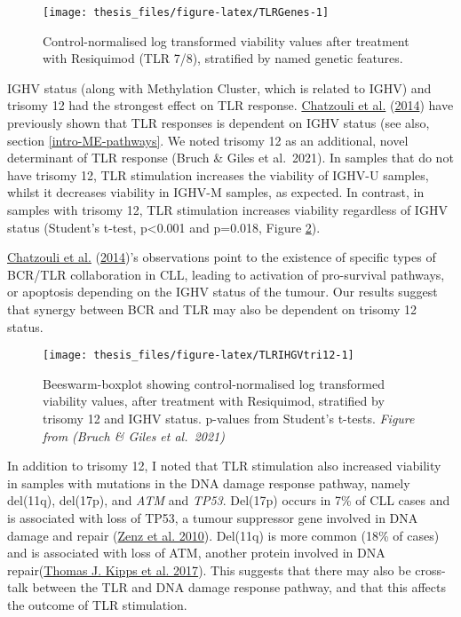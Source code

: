 \documentclass[11pt, a4paper, twosided]{book}
\begin{document}
\begin{figure}

{\centering \texttt{[image: thesis\_files/figure-latex/TLRGenes-1]} 

}

\caption{Control-normalised log transformed viability values after treatment with Resiquimod (TLR 7/8), stratified by named genetic features.}\label{fig:TLRGenes}
\end{figure}
IGHV status (along with Methylation Cluster, which is related to IGHV) and trisomy 12 had the strongest effect on TLR response. \protect\hyperlink{ref-Chatzouli2014}{Chatzouli et al.} (\protect\hyperlink{ref-Chatzouli2014}{2014}) have previously shown that TLR responses is dependent on IGHV status (see also, section \ref{intro-ME-pathways}. We noted trisomy 12 as an additional, novel determinant of TLR response (Bruch \& Giles et al.~2021). In samples that do not have trisomy 12, TLR stimulation increases the viability of IGHV-U samples, whilst it decreases viability in IGHV-M samples, as expected. In contrast, in samples with trisomy 12, TLR stimulation increases viability regardless of IGHV status (Student's t-test, p\textless0.001 and p=0.018, Figure \ref{fig:TLRIHGVtri12}).

\protect\hyperlink{ref-Chatzouli2014}{Chatzouli et al.} (\protect\hyperlink{ref-Chatzouli2014}{2014})'s observations point to the existence of specific types of BCR/TLR collaboration in CLL, leading to activation of pro-survival pathways, or apoptosis depending on the IGHV status of the tumour. Our results suggest that synergy between BCR and TLR may also be dependent on trisomy 12 status.


\begin{figure}

{\centering \texttt{[image: thesis\_files/figure-latex/TLRIHGVtri12-1]} 

}

\caption{Beeswarm-boxplot showing control-normalised log transformed viability values, after treatment with Resiquimod, stratified by trisomy 12 and IGHV status. p-values from Student's t-tests. \emph{Figure from (Bruch \& Giles et al.~2021)}}\label{fig:TLRIHGVtri12}
\end{figure}
In addition to trisomy 12, I noted that TLR stimulation also increased viability in samples with mutations in the DNA damage response pathway, namely del(11q), del(17p), and \emph{ATM} and \emph{TP53}. Del(17p) occurs in 7\% of CLL cases and is associated with loss of TP53, a tumour suppressor gene involved in DNA damage and repair (\protect\hyperlink{ref-Zenz2010}{Zenz et al. 2010}). Del(11q) is more common (18\% of cases) and is associated with loss of ATM, another protein involved in DNA repair(\protect\hyperlink{ref-Kipps2017}{Thomas J. Kipps et al. 2017}). This suggests that there may also be cross-talk between the TLR and DNA damage response pathway, and that this affects the outcome of TLR stimulation.
\end{document}
